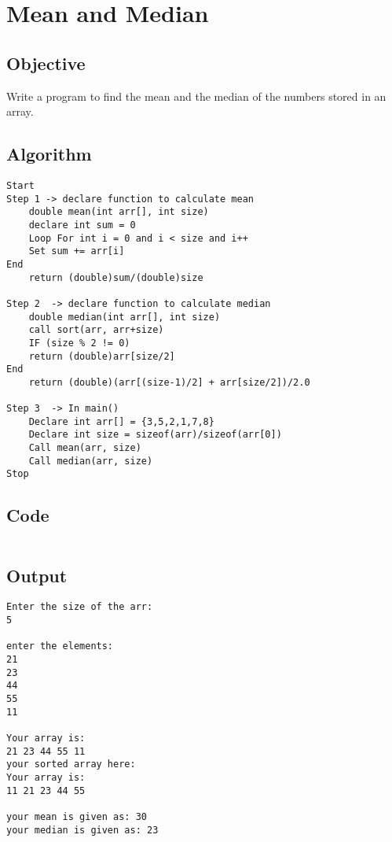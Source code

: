 \section{Mean and Median}
\label{sec:mean}
\subsection{Objective}
Write a program to find the mean and the median of the numbers stored in an array.

\subsection{Algorithm}
\begin{lstlisting}[style=mystyle]
Start
Step 1 -> declare function to calculate mean
    double mean(int arr[], int size)
    declare int sum = 0
    Loop For int i = 0 and i < size and i++
    Set sum += arr[i]
End
    return (double)sum/(double)size

Step 2  -> declare function to calculate median
    double median(int arr[], int size)
    call sort(arr, arr+size)
    IF (size % 2 != 0)
    return (double)arr[size/2]
End
    return (double)(arr[(size-1)/2] + arr[size/2])/2.0

Step 3  -> In main()
    Declare int arr[] = {3,5,2,1,7,8}
    Declare int size = sizeof(arr)/sizeof(arr[0])
    Call mean(arr, size)
    Call median(arr, size)
Stop

\end{lstlisting}

\pagebreak
\subsection{Code}

\inputminted[]{c}{../../Code/mean.c}

\subsection{Output}
\begin{lstlisting}[style=output]
Enter the size of the arr:
5

enter the elements: 
21
23
44
55
11

Your array is:
21 23 44 55 11 
your sorted array here: 
Your array is:
11 21 23 44 55 

your mean is given as: 30
your median is given as: 23
\end{lstlisting}



\pagebreak